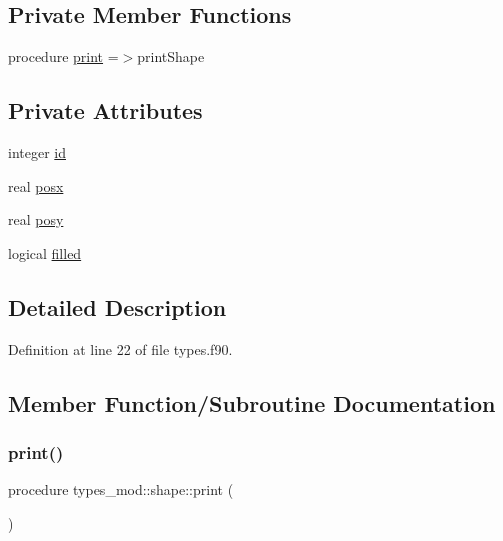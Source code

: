 \subsection*{Private Member Functions}
\begin{DoxyCompactItemize}
\item 
procedure \mbox{\hyperlink{structtypes__mod_1_1shape_a5dcc9f8c35d773c39cf2dd037384372f}{print}} =$>$print\+Shape
\end{DoxyCompactItemize}
\subsection*{Private Attributes}
\begin{DoxyCompactItemize}
\item 
integer \mbox{\hyperlink{structtypes__mod_1_1shape_a7b42c10b99ecc401b25653f24943c874}{id}}
\item 
real \mbox{\hyperlink{structtypes__mod_1_1shape_a85cc6141bd06372d74cca0ab698a90cb}{posx}}
\item 
real \mbox{\hyperlink{structtypes__mod_1_1shape_a0eadb644d5bf6cc0bdc1b966f7e7080e}{posy}}
\item 
logical \mbox{\hyperlink{structtypes__mod_1_1shape_a555f9af7c5614d1009ccdf4400f98585}{filled}}
\end{DoxyCompactItemize}


\subsection{Detailed Description}


Definition at line 22 of file types.\+f90.



\subsection{Member Function/\+Subroutine Documentation}
\mbox{\label{structtypes__mod_1_1shape_a5dcc9f8c35d773c39cf2dd037384372f}} 
\subsubsection{\texorpdfstring{print()}{print()}}
{\footnotesize\ttfamily procedure types\+\_\+mod\+::shape\+::print (\begin{DoxyParamCaption}{ }\end{DoxyParamCaption})\hspace{0.3cm}{\ttfamily [private]}}



